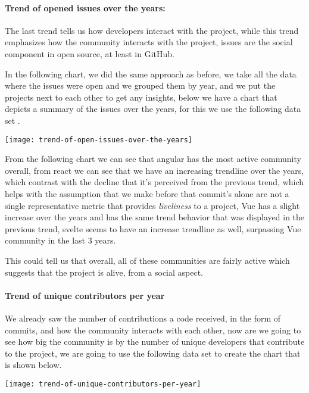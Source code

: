 \paragraph{Trend of opened issues over the years: }
The last trend tells us how developers interact with the project, while this trend emphasizes how the community interacts with the project, issues are the social component in open source, at least in GitHub.

In the following chart, we did the same approach as before, we take all the data where the issues were open and we grouped them by year, and we put the projects next to each other to get any insights, below we have a chart that depicts a summary of the issues over the years, for this we use the following data set \cite{trend-of-open-issues-over-the-years}.

\begin{center}
    \texttt{[image: trend-of-open-issues-over-the-years]}    
\end{center}

From the following chart we can see that angular has the most active community overall, from react we can see that we have an increasing trendline over the years, which contrast with the decline that it's perceived from the previous trend, which helps with the assumption that we make before that commit's alone are not a single representative metric that provides \textit{liveliness} to a project, Vue has a slight increase over the years and has the same trend behavior that was displayed in the previous trend, svelte seems to have an increase trendline as well, surpassing Vue community in the last 3 years.

This could tell us that overall, all of these communities are fairly active which suggests that the project is alive, from a social aspect.

\paragraph{Trend of unique contributors per year}
We already saw the number of contributions a code received, in the form of commits, and how the community interacts with each other, now are we going to see how big the community is by the number of unique developers that contribute to the project, we are going to use the following data set\cite{trend-of-unique-contributors-per-year} to create the chart that is shown below.

\begin{center}
    \texttt{[image: trend-of-unique-contributors-per-year]}    
\end{center}

